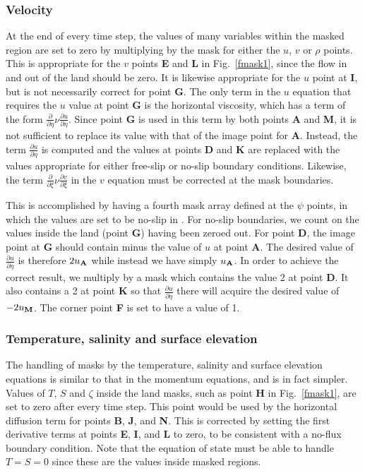 \subsubsection{Velocity}
At the end of every time step, the values of many variables within the
masked region are set to zero by multiplying by the mask for either the
$u$, $v$ or $\rho$ points.  This is appropriate for the $v$ points {\bf
E} and {\bf L} in Fig.\ \ref{fmask1}, since the flow in and out of the
land should be zero.  It is likewise appropriate for the $u$ point at
{\bf I}, but is not necessarily correct for point {\bf G}.  The only
term in the $u$ equation that requires the $u$ value at point {\bf G}
is the horizontal viscosity, which has a term of the form
$\frac{\partial}{\partial \eta} \nu \frac{\partial u}{\partial \eta}$.
Since point {\bf G} is used in this term by both points {\bf A} and
{\bf M}, it is not sufficient to replace its value with that of the
image point for {\bf A}.  Instead, the term $\frac{\partial u}{\partial
\eta}$ is computed and the values at points {\bf D} and {\bf K} are
replaced with the values appropriate for either free-slip or no-slip
boundary conditions.  Likewise, the term $\frac{\partial}{\partial \xi}
\nu \frac{\partial v}{\partial \xi}$ in the $v$ equation must be corrected
at the mask boundaries.

This is accomplished by having a fourth mask array defined at the $\psi$
points, in which the values are set to be no-slip in .
For no-slip boundaries, we count on the values inside
the land (point {\bf G}) having been zeroed out.  For point {\bf D}, the
image point at {\bf G} should contain minus the value of $u$ at point
{\bf A}.  The desired value of $\frac{\partial u}{\partial \eta}$ is
therefore $2 u_{\bf A}$ while instead we have simply $u_{\bf A}$.
In order to achieve the correct result, we multiply by a mask which
contains the value 2 at point {\bf D}.  It also contains a 2 at point
{\bf K} so that $\frac{\partial u}{\partial \eta}$ there will acquire
the desired value of $-2 u_{\bf M}$. The corner point {\bf F} is set to
have a value of 1.

\subsubsection{Temperature, salinity and surface elevation}

The handling of masks by the temperature, salinity and surface
elevation equations is similar to that in the momentum equations, and
is in fact simpler.  Values of $T$, $S$ and $\zeta$ inside the land
masks, such as point {\bf H} in Fig.\ \ref{fmask1}, are set to zero
after every time step.  This point would be used by the horizontal
diffusion term for points {\bf B}, {\bf J}, and {\bf N}.  This is
corrected by setting the first derivative terms at points {\bf E}, {\bf
I}, and {\bf L} to zero, to be consistent with a no-flux boundary
condition.
Note that the equation of state must be able to handle $T = S = 0$
since these are the values inside masked regions.

